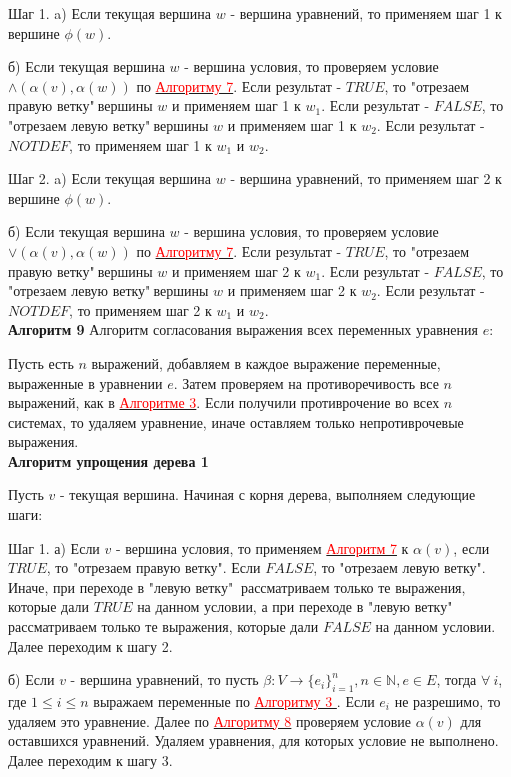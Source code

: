 \documentclass[12pt]{article}
\begin{document}
       Шаг 1. a) Если текущая вершина $w$ - вершина уравнений, то применяем шаг 1 к вершине $\phi(w)$. 
       
       б) Если текущая вершина $w$ - вершина условия, то проверяем условие $\wedge(\alpha(v),\alpha(w))$ по  \hyperlink{a7}{ \textcolor{red}{Алгоритму 7}}. Если результат - $TRUE$, то "отрезаем правую ветку"$\:$вершины $w$ и применяем шаг 1 к $w_{1}$. Если результат - $FALSE$, то "отрезаем левую ветку"$\:$вершины $w$ и применяем шаг 1 к $w_{2}$. Если результат - $NOTDEF$, то применяем шаг 1 к $w_{1}$ и $w_{2}$. 
       
       Шаг 2. a) Если текущая вершина $w$ - вершина уравнений, то применяем шаг 2 к вершине $\phi(w)$.
       
        б) Если текущая вершина $w$ - вершина условия, то проверяем условие $\vee(\alpha(v),\alpha(w))$ по \hyperlink{a7}{ \textcolor{red}{Алгоритму 7}}. Если результат - $TRUE$, то "отрезаем правую ветку"$\:$вершины $w$ и применяем шаг 2 к $w_{1}$. Если результат - $FALSE$, то "отрезаем левую ветку"$\:$вершины $w$ и применяем шаг 2 к $w_{2}$. Если результат - $NOTDEF$, то применяем шаг 2 к $w_{1}$ и $w_{2}$.
      \\
      
      \hypertarget{a9}{{\bf Алгоритм 9}} Алгоритм согласования выражения всех переменных уравнения $e$:
      
      Пусть есть $n$ выражений, добавляем в каждое выражение переменные, выраженные в уравнении $e$. Затем проверяем на противоречивость все $n$ выражений, как в  \hyperlink{a3}{ \textcolor{red}{Алгоритме 3}}. Если получили противрочение во всех $n$ системах, то удаляем уравнение, иначе оставляем только непротиврочевые выражения.
      \\
      
     {\bf Алгоритм упрощения дерева 1} 
     
     Пусть $v$ - текущая вершина.
     Начиная с корня дерева, выполняем следующие шаги:
     
     Шаг 1. а) Если $v$ - вершина условия, то применяем  \hyperlink{a7}{ \textcolor{red}{Алгоритм 7}} к  $\alpha(v)$, если $TRUE$, то "отрезаем правую ветку".  Если $FALSE$, то "отрезаем левую ветку". Иначе, при переходе в "левую ветку"$\:$ рассматриваем только те выражения, которые дали $TRUE$ на данном условии, а при переходе в "левую ветку"$\:$ рассматриваем только те выражения, которые дали $FALSE$ на данном условии. Далее переходим к шагу 2.
     
     б) Если $v$ - вершина уравнений, то пусть $\beta : V \rightarrow \lbrace  e_{i}  \rbrace_{i=1}^{n}, n \in \mathbb{N}, e \in E$, тогда $\forall \: i$, где $ 1 \leq i \leq n$ выражаем переменные по \hyperlink{a3}{ \textcolor{red}{Алгоритму 3 }}. Если $e_{i} $ не разрешимо, то удаляем это уравнение. Далее по \hyperlink{a8}{ \textcolor{red}{Алгоритму 8}} проверяем условие $\alpha(v)$ для оставшихся уравнений. Удаляем уравнения, для которых условие не выполнено. Далее переходим к шагу 3.
          
\end{document}
